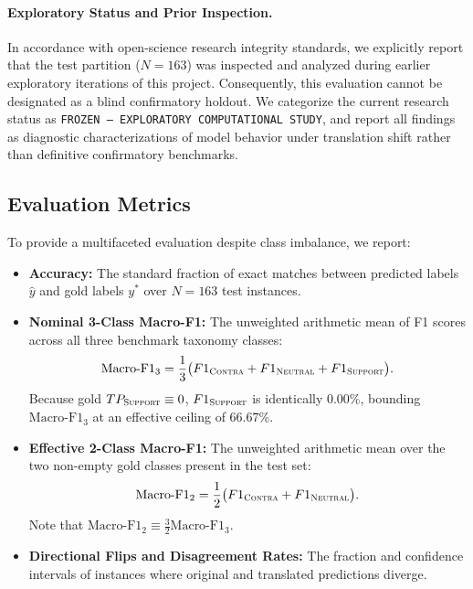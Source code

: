 \paragraph{Exploratory Status and Prior Inspection.}
In accordance with open-science research integrity standards, we explicitly report that the test partition ($N=163$) was inspected and analyzed during earlier exploratory iterations of this project. Consequently, this evaluation cannot be designated as a blind confirmatory holdout. We categorize the current research status as \texttt{FROZEN — EXPLORATORY COMPUTATIONAL STUDY}, and report all findings as diagnostic characterizations of model behavior under translation shift rather than definitive confirmatory benchmarks.

\subsection{Evaluation Metrics}
To provide a multifaceted evaluation despite class imbalance, we report:
\begin{itemize}
    \item \textbf{Accuracy:} The standard fraction of exact matches between predicted labels $\hat{y}$ and gold labels $y^*$ over $N=163$ test instances.
    \item \textbf{Nominal 3-Class Macro-F1:} The unweighted arithmetic mean of F1 scores across all three benchmark taxonomy classes:
    \begin{equation}
        \text{Macro-F1}_{3} = \frac{1}{3} \big(F1_{\textsc{Contra}} + F1_{\textsc{Neutral}} + F1_{\textsc{Support}}\big).
    \end{equation}
    Because gold $TP_{\textsc{Support}} \equiv 0$, $F1_{\textsc{Support}}$ is identically 0.00\%, bounding $\text{Macro-F1}_{3}$ at an effective ceiling of 66.67\%.
    \item \textbf{Effective 2-Class Macro-F1:} The unweighted arithmetic mean over the two non-empty gold classes present in the test set:
    \begin{equation}
        \text{Macro-F1}_{2} = \frac{1}{2} \big(F1_{\textsc{Contra}} + F1_{\textsc{Neutral}}\big).
    \end{equation}
    Note that $\text{Macro-F1}_{2} \equiv \frac{3}{2} \text{Macro-F1}_{3}$.
    \item \textbf{Directional Flips and Disagreement Rates:} The fraction and confidence intervals of instances where original and translated predictions diverge.
\end{itemize}

